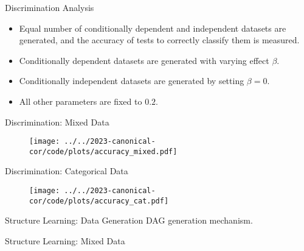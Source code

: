 \documentclass{beamer}
\begin{document}
\begin{frame}{Discrimination Analysis}

\begin{center}
\end{center}

\begin{itemize}
	\item Equal number of conditionally dependent and independent datasets are generated, and the accuracy of tests to correctly classify them is measured.
	\item Conditionally dependent datasets are generated with varying effect $ \beta $.
	\item Conditionally independent datasets are generated by setting $ \beta = 0 $.
	\item All other parameters are fixed to $ 0.2 $.
\end{itemize}

\end{frame}

\begin{frame}{Discrimination: Mixed Data}
	\begin{figure}[t]
		\centering
		\texttt{[image: ../../2023-canonical-cor/code/plots/accuracy\_mixed.pdf]}
	\end{figure}
\end{frame}

\begin{frame}{Discrimination: Categorical Data}
	\begin{figure}[t]
		\centering
		\texttt{[image: ../../2023-canonical-cor/code/plots/accuracy\_cat.pdf]}
	\end{figure}
\end{frame}


\begin{frame}{Structure Learning: Data Generation}
	DAG generation mechanism.
\end{frame}

\begin{frame}{Structure Learning: Mixed Data}
\end{frame}
\end{document}
